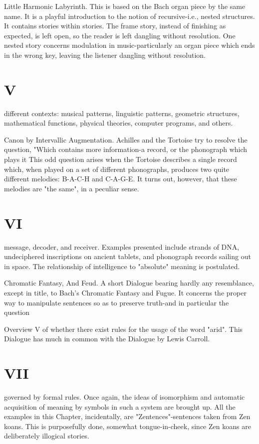 Little Harmonic Labyrinth. This is based on the Bach organ piece by the same name. It is a playful introduction to the notion of recursive-i.e., nested structures. It contains stories within stories. The frame story, instead of finishing as expected, is left open, so the reader is left dangling without resolution. One nested story concerns modulation in music-particularly an organ piece which ends in the wrong key, leaving the listener dangling without resolution. 


\chapter {V}
different contexts: musical patterns, linguistic patterns, geometric structures, mathematical functions, physical theories, computer programs, and others. 

Canon by Intervallic Augmentation. Achilles and the Tortoise try to resolve the question, "Which contains more information-a record, or the phonograph which plays it This odd question arises when the Tortoise describes a single record which, when played on a set of different phonographs, produces two quite different melodies: B-A-C-H and C-A-G-E. It turns out, however, that these melodies are "the same", in a peculiar sense. 


\chapter {VI}
message, decoder, and receiver. Examples presented include strands of DNA, undeciphered inscriptions on ancient tablets, and phonograph records sailing out in space. The relationship of intelligence to "absolute" meaning is postulated. 

Chromatic Fantasy, And Feud. A short Dialogue bearing hardly any resemblance, except in title, to Bach's Chromatic Fantasy and Fugue. It concerns the proper way to manipulate sentences so as to preserve truth-and in particular the question 







Overview                                                                                              V of whether there exist rules for the usage of the word "arid". This Dialogue has much in common with the Dialogue by Lewis Carroll. 


\chapter {VII}
governed by formal rules. Once again, the ideas of isomorphism and automatic acquisition of meaning by symbols in such a system are brought up. All the examples in this Chapter, incidentally, are "Zentences"-sentences taken from Zen koans. This is purposefully done, somewhat tongue-in-cheek, since Zen koans are deliberately illogical stories. 

